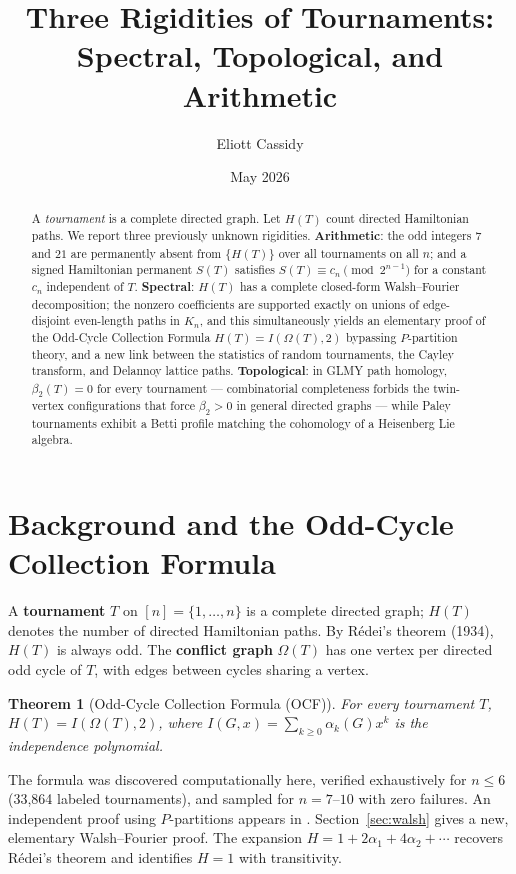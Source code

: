 \documentclass[11pt,reqno]{amsart}
\title[Novel Results in Tournament Combinatorics]{Three Rigidities of Tournaments:\\
Spectral, Topological, and Arithmetic}
\author{Eliott Cassidy}
\date{May 2026}
\theoremstyle{plain}
\newtheorem{thm}{Theorem}[section]
\theoremstyle{definition}
\theoremstyle{remark}
\begin{document}
\begin{abstract}
A \emph{tournament} is a complete directed graph.  Let $H(T)$ count directed
Hamiltonian paths.  We report three previously unknown rigidities.
\textbf{Arithmetic}: the odd integers $7$ and $21$ are permanently absent from
$\{H(T)\}$ over all tournaments on all $n$; and a signed Hamiltonian permanent
$S(T)$ satisfies $S(T)\equiv c_n\pmod{2^{n-1}}$ for a constant $c_n$
independent of $T$.
\textbf{Spectral}: $H(T)$ has a complete closed-form Walsh--Fourier
decomposition; the nonzero coefficients are supported exactly on
unions of edge-disjoint even-length paths in $K_n$, and this
simultaneously yields an elementary proof of the Odd-Cycle Collection
Formula $H(T)=I(\Omega(T),2)$ bypassing $P$-partition theory, and a new link
between the statistics of random tournaments, the Cayley transform, and
Delannoy lattice paths.
\textbf{Topological}: in GLMY path homology, $\beta_2(T)=0$ for every
tournament --- combinatorial completeness forbids the twin-vertex configurations
that force $\beta_2>0$ in general directed graphs --- while Paley tournaments
exhibit a Betti profile matching the cohomology of a Heisenberg Lie algebra.
\end{abstract}

\maketitle

\section{Background and the Odd-Cycle Collection Formula}

A \textbf{tournament} $T$ on $[n]=\{1,\dots,n\}$ is a complete directed graph;
$H(T)$ denotes the number of directed Hamiltonian paths.  By R\'edei's theorem
(1934), $H(T)$ is always odd.
The \textbf{conflict graph} $\Omega(T)$ has one vertex per directed odd cycle of
$T$, with edges between cycles sharing a vertex.

\begin{thm}[Odd-Cycle Collection Formula (OCF)]\label{thm:ocf}
For every tournament $T$,\quad $H(T)=I(\Omega(T),2)$,
where $I(G,x)=\sum_{k\ge 0}\alpha_k(G)x^k$ is the independence polynomial.
\end{thm}

The formula was discovered computationally here, verified exhaustively for
$n\le 6$ (33,864 labeled tournaments), and sampled for $n=7$--$10$ with zero
failures.  An independent proof using $P$-partitions appears in \cite{GS24}.
Section~\ref{sec:walsh} gives a new, elementary Walsh--Fourier proof.
The expansion $H=1+2\alpha_1+4\alpha_2+\cdots$
recovers R\'edei's theorem and identifies $H=1$ with transitivity.
\end{document}
